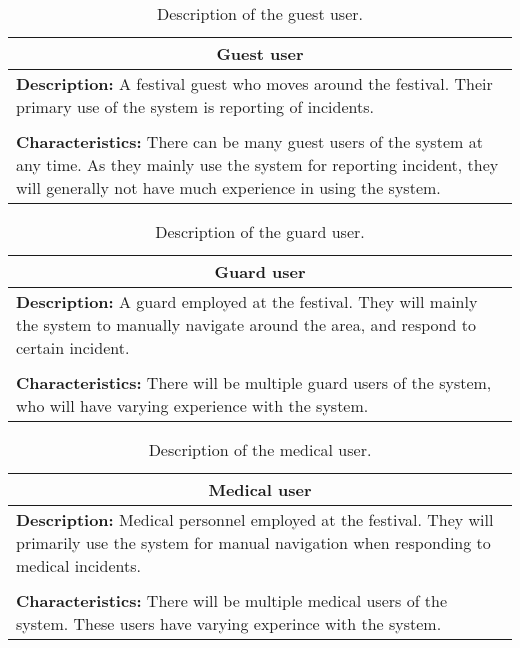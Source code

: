 \begin{table}[h!]
    \centering
    \begin{tabularx}{/4}{X}
        \toprule
        \multicolumn{1}{c}{\textbf{Guest user}} \\ 
        \midrule
        \textbf{Description:} A festival guest who moves around the festival. Their primary use of the system is reporting of incidents. \\
        \\
        \textbf{Characteristics:} There can be many guest users of the system at any time. As they mainly use the system for reporting incident, they will generally not have much experience in using the system. \\
        \bottomrule
    \end{tabularx}
    \caption{Description of the guest user.}
    \label{tab:guest_user}
\end{table}

\begin{table}[h!]
    \centering
    \begin{tabularx}{/4}{X}
        \toprule
        \multicolumn{1}{c}{\textbf{Guard user}} \\ 
        \midrule
        \textbf{Description:} A guard employed at the festival. They will mainly the system to manually navigate around the area, and respond to certain incident. \\
        \\
        \textbf{Characteristics:} There will be multiple guard users of the system, who will have varying experience with the system. \\
        \bottomrule
    \end{tabularx}
    \caption{Description of the guard user.}
    \label{tab:guard_user}
\end{table}

\begin{table}[h!]
    \centering
    \begin{tabularx}{/4}{X}
        \toprule
        \multicolumn{1}{c}{\textbf{Medical user}} \\ 
        \midrule
        \textbf{Description:} Medical personnel employed at the festival. They will primarily use the system for manual navigation when responding to medical incidents. \\
        \\
        \textbf{Characteristics:} There will be multiple medical users of the system. These users have varying experince with the system. \\
        \bottomrule
    \end{tabularx}
    \caption{Description of the medical user.}
    \label{tab:med_user}
\end{table}